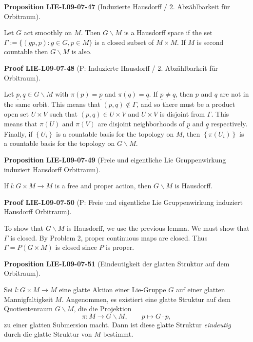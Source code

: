 \documentclass[10pt, letterpaper]{article}
\newcommand{\CustomHeading}[3]{%
  \par\medskip\noindent%
  \textbf{#1 #2} \textnormal{(#3)}.\enskip%
}
\newenvironment{PROP}[2]{\CustomHeading{Proposition}{#1}{#2}}{}
\newenvironment{PROOF}[2]{\CustomHeading{Proof}{#1}{#2}}{}
\begin{document}
\begin{PROP}{LIE-L09-07-47}{Induzierte Hausdorff / 2. Abzählbarkeit für Orbitraum}
Let $G$ act smoothly on $M$. Then $G \backslash M$ is a Hausdorff space if the set $\Gamma:=\{(g p, p): g \in G, p \in M\}$ is a closed subset of $M \times M$. If $M$ is second countable then $G \backslash M$ is also.
\end{PROP}

\begin{PROOF}{LIE-L09-07-48}{P: Induzierte Hausdorff / 2. Abzählbarkeit für Orbitraum}
Let $\underline{p}, \underline{q} \in G \backslash M$ with $\pi(p)=\underline{p}$ and $\pi(q)=\underline{q}$. If $\underline{p} \neq \underline{q}$, then $p$ and $q$ are not in the same orbit. This means that $(p, q) \notin \Gamma$, and so there must be a product open set $U \times V$ such that $(p, q) \in U \times V$ and $U \times V$ is disjoint from $\Gamma$. This means that $\pi(U)$ and $\pi(V)$ are disjoint neighborhoods of $\underline{p}$ and $\underline{q}$ respectively. Finally, if $\left\{U_{i}\right\}$ is a countable basis for the topology on $M$, then $\left\{\pi\left(U_{i}\right)\right\}$ is a countable basis for the topology on $G \backslash M$.
\end{PROOF}

\begin{PROP}{LIE-L09-07-49}{Freie und eigentliche Lie Gruppenwirkung induziert Hausdorff Orbitraum}
If $l: G \times M \rightarrow M$ is a free and proper action, then $G \backslash M$ is Hausdorff.
\end{PROP}

\begin{PROOF}{LIE-L09-07-50}{P: Freie und eigentliche Lie Gruppenwirkung induziert Hausdorff Orbitraum}
To show that $G \backslash M$ is Hausdorff, we use the previous lemma. We must show that $\Gamma$ is closed. By Problem 2, proper continuous maps are closed. Thus $\Gamma=P(G \times M)$ is closed since $P$ is proper.
\end{PROOF}

\begin{PROP}{LIE-L09-07-51}{Eindeutigkeit der glatten Struktur auf dem Orbitraum}
Sei $l:G\times M\to M$ eine glatte Aktion einer Lie-Gruppe $G$ auf einer glatten Mannigfaltigkeit $M$.
Angenommen, es existiert eine glatte Struktur auf dem Quotientenraum $G\backslash M$,
die die Projektion
\[
\pi:M\longrightarrow G\backslash M,\qquad p\longmapsto G\cdot p,
\]
zu einer glatten Submersion macht.
Dann ist diese glatte Struktur \emph{eindeutig} durch die glatte Struktur von $M$ bestimmt.
\end{PROP}
\end{document}
